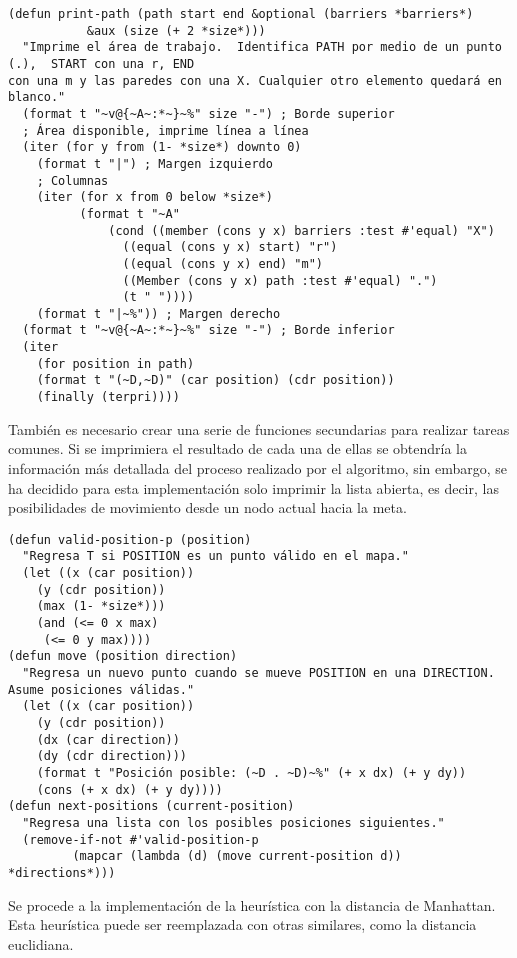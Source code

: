 \documentclass[a4paper,12pt]{article}
\begin{document}
\lstset{language=Lisp,label= ,caption= ,captionpos=b,numbers=none,numbers=left}
\begin{lstlisting}
(defun print-path (path start end &optional (barriers *barriers*)
		   &aux (size (+ 2 *size*)))
  "Imprime el área de trabajo.  Identifica PATH por medio de un punto (.),  START con una r, END
con una m y las paredes con una X. Cualquier otro elemento quedará en blanco."
  (format t "~v@{~A~:*~}~%" size "-") ; Borde superior
  ; Área disponible, imprime línea a línea
  (iter (for y from (1- *size*) downto 0)
	(format t "|") ; Margen izquierdo
	; Columnas
	(iter (for x from 0 below *size*)
	      (format t "~A"
		      (cond ((member (cons y x) barriers :test #'equal) "X")
			    ((equal (cons y x) start) "r")
			    ((equal (cons y x) end) "m")
			    ((Member (cons y x) path :test #'equal) ".")
			    (t " "))))
	(format t "|~%")) ; Margen derecho
  (format t "~v@{~A~:*~}~%" size "-") ; Borde inferior
  (iter
    (for position in path)
    (format t "(~D,~D)" (car position) (cdr position))
    (finally (terpri))))
\end{lstlisting}

También es necesario crear una serie de funciones secundarias para realizar tareas comunes. Si se imprimiera el resultado de cada una de ellas se obtendría la información más detallada del proceso realizado por el algoritmo, sin embargo, se ha decidido para esta implementación solo imprimir la lista abierta, es decir, las posibilidades de movimiento desde un nodo actual hacia la meta.

\lstset{language=Lisp,label= ,caption= ,captionpos=b,numbers=none,numbers=left}
\begin{lstlisting}
(defun valid-position-p (position)
  "Regresa T si POSITION es un punto válido en el mapa."
  (let ((x (car position))
	(y (cdr position))
	(max (1- *size*)))
    (and (<= 0 x max)
	 (<= 0 y max))))
(defun move (position direction)
  "Regresa un nuevo punto cuando se mueve POSITION en una DIRECTION. Asume posiciones válidas."
  (let ((x (car position))
	(y (cdr position))
	(dx (car direction))
	(dy (cdr direction)))
    (format t "Posición posible: (~D . ~D)~%" (+ x dx) (+ y dy))
    (cons (+ x dx) (+ y dy))))
(defun next-positions (current-position)
  "Regresa una lista con los posibles posiciones siguientes."
  (remove-if-not #'valid-position-p
		 (mapcar (lambda (d) (move current-position d)) *directions*)))
\end{lstlisting}

Se procede a la implementación de la heurística con la distancia de Manhattan. Esta heurística puede ser reemplazada con otras similares, como la distancia euclidiana.
\end{document}

